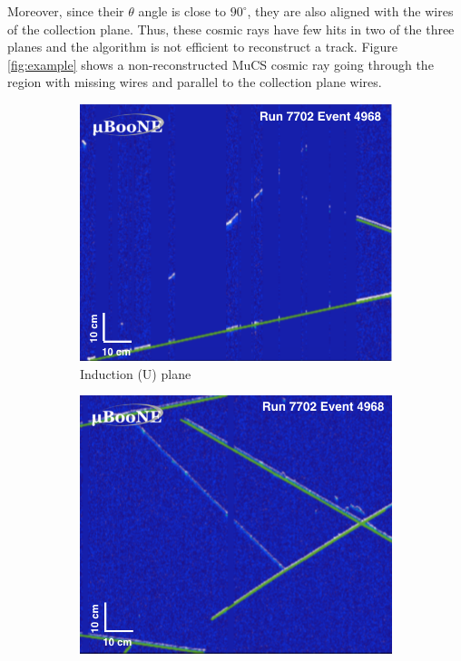 \documentclass[a4paper]{scrartcl}
\begin{document}
Moreover, since their $\theta$ angle is close to $90^\circ$, they are also aligned with the wires of the collection plane. Thus, these cosmic rays have few hits in two of the three planes and the algorithm is not efficient to reconstruct a track. Figure \ref{fig:example} shows a non-reconstructed MuCS cosmic ray going through the region with missing wires and parallel to the collection plane wires.

\begin{figure}[htbp]
  \begin{center}
    \begin{subfigure}{0.3\textwidth}
      \includegraphics[width=\linewidth]{figures/u.png}
      \caption{Induction (U) plane} \label{fig:u}
    \end{subfigure}
    \begin{subfigure}{0.3\textwidth}
      \includegraphics[width=\linewidth]{figures/v.png}

\end{subfigure}
\end{center}
\end{figure}
\end{document}
